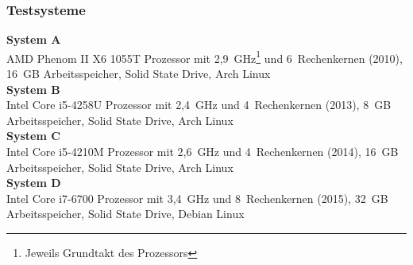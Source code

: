     \begin{frame}[noframenumbering]
      \frametitle{Testsysteme}
      {
        \footnotesize
        \textbf{System A}\\
          AMD Phenom II X6 1055T Prozessor mit 2,9~GHz\footnote{Jeweils Grundtakt des Prozessors} und 6~Rechenkernen (2010), 16~GB Arbeitsspeicher, Solid State Drive, Arch Linux\\[1em]
        \textbf{System B}\\
          Intel Core i5-4258U Prozessor mit 2,4~GHz und 4~Rechenkernen (2013), 8~GB Arbeitsspeicher, Solid State Drive, Arch Linux\\[1em]
        \textbf{System C}\\
          Intel Core i5-4210M Prozessor mit 2,6~GHz und 4~Rechenkernen (2014), 16~GB Arbeitsspeicher, Solid State Drive, Arch Linux\\[1em]
        \textbf{System D}\\
          Intel Core i7-6700 Prozessor mit 3,4~GHz und 8~Rechenkernen (2015), 32~GB Arbeitsspeicher, Solid State Drive, Debian Linux
      }
    \end{frame}


